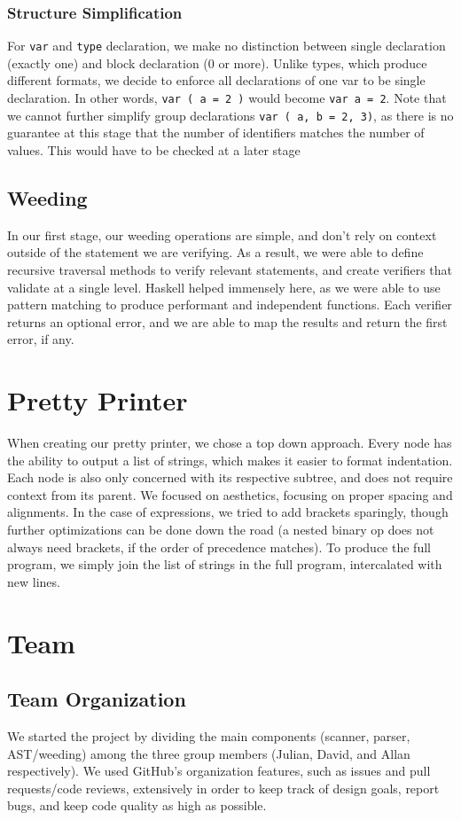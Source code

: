\documentclass[11pt]{article}
\begin{document}
\subsubsection{Structure Simplification}
\label{sec:org195d7ab}
For \texttt{var} and \texttt{type} declaration, we make no distinction between
single declaration (exactly one) and block declaration (0 or
more). Unlike types, which produce different formats, we decide to
enforce all declarations of one var to be single declaration. In
other words, \texttt{var ( a = 2 )} would become \texttt{var a = 2}. Note that
we cannot further simplify group declarations \texttt{var ( a, b = 2,
    3)}, as there is no guarantee at this stage that the number of
identifiers matches the number of values. This would have to be
checked at a later stage
\subsection{Weeding}
\label{sec:orga241a99}
In our first stage, our weeding operations are simple, and don't rely
on context outside of the statement we are verifying. As a result,
we were able to define recursive traversal methods to verify relevant
statements, and create verifiers that validate at a single level.
Haskell helped immensely here, as we were able to use pattern matching
to produce performant and independent functions.
Each verifier returns an optional error, and we are able to map the results
and return the first error, if any.
\section{Pretty Printer}
\label{sec:org5fbc631}
When creating our pretty printer, we chose a top down approach.
Every node has the ability to output a list of strings, which makes
it easier to format indentation. Each node is also only concerned
with its respective subtree, and does not require context from its
parent. We focused on aesthetics, focusing on proper spacing and
alignments. In the case of expressions, we tried to add brackets
sparingly, though further optimizations can be done down the road
(a nested binary op does not always need brackets, if the order of
precedence matches). To produce the full program, we simply join
the list of strings in the full program, intercalated with new lines.
\section{Team}
\label{sec:org5bccf93}
\subsection{Team Organization}
\label{sec:orgf24c344}
We started the project by dividing the main components (scanner, parser,
AST/weeding) among the three group members (Julian, David, and Allan
respectively). We used GitHub's organization features, such as issues
and pull requests/code reviews, extensively in order to keep track of
design goals, report bugs, and keep code quality as high as possible.
\end{document}
